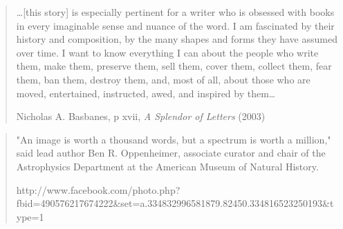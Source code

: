 

\mainmatter

\begin{quote}

\ldots [this story] is especially pertinent for a writer who is
obsessed with books in every imaginable sense and nuance of the
word. I am fascinated by their history and composition, by the many
shapes and forms they have assumed over time. I want to know
everything I can about the people who write them, make them, preserve
them, sell them, cover them, collect them, fear them, ban them,
destroy them, and, most of all, about those who are moved,
entertained, instructed, awed, and inspired by them\ldots

         Nicholas A. Basbanes, p xvii, {\it A Splendor of Letters} (2003)\cite{basbanes:2003}
\end{quote}


\begin{quote}

"An image is worth a thousand words, but a spectrum is worth a million," said lead author Ben R. Oppenheimer, associate curator and chair of the Astrophysics Department at the American Museum of Natural History.

http://www.facebook.com/photo.php?fbid=490576217674222&set=a.334832996581879.82450.334816523250193&type=1
\end{quote}

\backmatter





